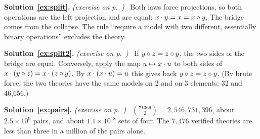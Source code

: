 \documentclass[11pt,a4paper]{article}
\newcommand{\solution}[1]{\par\medskip\noindent\textbf{Solution~\ref{ex:#1}.}\label{sol:#1}
  \textit{(exercise on p.~\pageref{ex:#1})}\ }
\begin{document}
\solution{split}
Both laws force projections, so both operations are the left projection and are equal: $x\cdot y=x=x\circ y$. The
bridge comes from the collapse. The rule ``require a model with two different, essentially binary
operations'' excludes the theory.

\solution{split2}
If $y\circ z=z\circ y$, the two sides of the bridge are equal. Conversely, apply the map $u\mapsto x\cdot u$ to both sides of
$x\cdot(y\circ z)=x\cdot(z\circ y)$. By $x\cdot(x\cdot u)=u$ this gives back $y\circ z=z\circ y$. (By brute force, the two theories have
the same models on 2 and on 3 elements: 32 and 46,656.)

\solution{pairs}
$\binom{71369}{2}=2{,}546{,}731{,}396$, about $2.5\times10^9$ pairs, and about $1.1\times10^{18}$ sets of four. The
$7{,}476$ verified theories are less than three in a million of the pairs alone.
\end{document}
